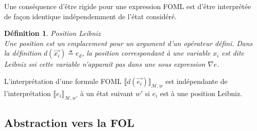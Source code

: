 \documentclass[12pt]{article}
\newcommand{\M}{\ensuremath{\mathcal{M}}}
\newcommand{\raph}[1]{\textcolor{red}{#1}}
\newcommand{\bpar}[1]{\marginpar{\color{myblue}\footnotesize\raggedright#1}}
\newtheorem{defin}{Définition}
\begin{document}
Une conséquence d'être rigide pour une expression FOML est d'être interprétée de façon identique indépendemment de l'état considéré.


\begin{defin} \emph{Position Leibniz} \\
  Une position est un emplacement pour un argument d'un opérateur défini.
  Dans la définition $d(\vec{x_i}) \triangleq e_d$, la position correspondant à une variable $x_i$ est dite Leibniz ssi cette variable n'apparait pas dans une sous expression %
  $\nabla e$.
\end{defin}

L'interprétation d'une formule FOML $\llbracket d(\vec{e_i}) \rrbracket_{\M, w}$ est indépendante de l'interprétation $\llbracket e_i \rrbracket_{\M, w'}$ à un état suivant $w'$ si $e_i$ est à une position Leibniz.

\subsection{Abstraction vers la FOL}

\end{document}
